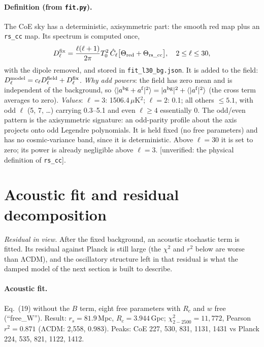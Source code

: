 \documentclass[10pt,twocolumn]{article}
\newcommand{\flag}[1]{\textsf{[unverified: #1]}}
\begin{document}
\paragraph{Definition (from \texttt{fit.py}).} The CoE sky has a deterministic, axisymmetric part: the smooth red map plus an \texttt{rs\_cc} map. Its spectrum is computed once,
\begin{equation}
D^{\rm fix}_\ell=\frac{\ell(\ell+1)}{2\pi}T_0^2\,\hat C_\ell\big[\Theta_{\rm red}+\Theta_{\rm rs\_cc}\big],\quad 2\le\ell\le30,
\end{equation}
with the dipole removed, and stored in \texttt{fit\_l30\_bg.json}. It is added to the field: $D^{\rm model}_\ell=c_\ell D^{\rm field}_\ell+D^{\rm fix}_\ell$. \emph{Why add powers}: the field has zero mean and is independent of the background, so $\langle|a^{\rm bg}+a^{\rm f}|^2\rangle=|a^{\rm bg}|^2+\langle|a^{\rm f}|^2\rangle$ (the cross term averages to zero). \emph{Values}: $\ell=3$: 1506.4\,$\mu$K$^2$; $\ell=2$: 0.1; all others $\le5.1$, with odd $\ell$ (5, 7, \ldots) carrying 0.3--5.1 and even $\ell\ge4$ essentially 0. The odd/even pattern is the axisymmetric signature: an odd-parity profile about the axis projects onto odd Legendre polynomials. It is held fixed (no free parameters) and has no cosmic-variance band, since it is deterministic. Above $\ell=30$ it is set to zero; its power is already negligible above $\ell=3$. \flag{the physical definition of \texttt{rs\_cc}}.

\section{Acoustic fit and residual decomposition}
\noindent\emph{Residual in view.} After the fixed background, an acoustic stochastic term is fitted. Its residual against Planck is still large (the $\chi^2$ and $r^2$ below are worse than ΛCDM), and the oscillatory structure left in that residual is what the damped model of the next section is built to describe.

\paragraph{Acoustic fit.} Eq.~(19) without the $B$ term, eight free parameters with $R_c$ and $w$ free (``free\_W''). Result: $r_s=81.9$\,Mpc, $R_c=3.944$\,Gpc; $\chi^2_{2-2500}=11{,}772$, Pearson $r^2=0.871$ (ΛCDM: 2{,}558, 0.983). Peaks: CoE 227, 530, 831, 1131, 1431 vs Planck 224, 535, 821, 1122, 1412.
\end{document}
